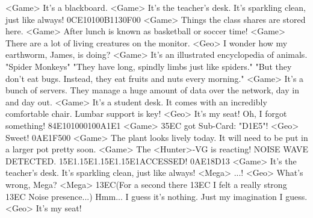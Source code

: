 <Game> It's a blackboard. 
<Game> It's the teacher's desk. 
It's sparkling clean, just like always! 
{0C}{E1}{01}{00}{B1}{13}{0F}{00}
<Game> Things the class shares are stored here. 
<Game> After lunch is known as basketball or soccer time! 
<Game> There are a lot of living creatures on the monitor. 
<Geo> I wonder how my earthworm, James, is doing? 
<Game> It's an illustrated encyclopedia of animals. 
"Spider Monkeys" 
"They have long, spindly limbs just like spiders." 
"But they don't eat bugs. Instead, they eat fruits and nuts every morning." 
<Game> It's a bunch of servers. 
They manage a huge amount of data over the network, day in and day out. 
<Game> It's a student desk. 
It comes with an incredibly comfortable chair. Lumbar support is key! 
<Geo> It's my seat! 
Oh, I forgot something! 
{84}{E1}{01}{00}{01}{00}{A1}{E1} 
<Game> {35}{EC} got Sub-Card: "{D1}{E5}"! 
<Geo> Sweet! 
{0A}{E1}{F5}{00}
<Game> The plant looks lively today. 
It will need to be put in a larger pot pretty soon. 
<Game> The <Hunter>-VG is reacting! 
NOISE WAVE DETECTED. {15}{E1}.{15}{E1}.{15}{E1}.{15}{E1}ACCESSED! 
{0A}{E1}{8D}{13}
<Game> It's the teacher's desk. It's sparkling clean, just like always! 
<Mega> ...! 
<Geo> What's wrong, Mega? 
<Mega> {13}{EC}(For a second there {13}{EC} I felt a really strong {13}{EC} Noise presence...) 
Hmm... I guess it's nothing. Just my imagination I guess. 
<Geo> It's my seat! 
